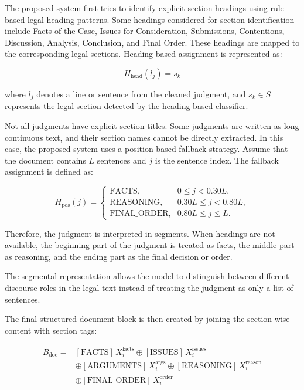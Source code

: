 \documentclass[11pt, a4paper]{article}
\theoremstyle{plain}%
\theoremstyle{remark}%
\theoremstyle{definition}%
\begin{document}
The proposed system first tries to identify explicit section headings using rule-based legal heading patterns. Some headings considered for section identification include Facts of the Case, Issues for Consideration, Submissions, Contentions, Discussion, Analysis, Conclusion, and Final Order. These headings are mapped to the corresponding legal sections. Heading-based assignment is represented as:

\begin{equation}
H_{\text{head}}(l_j) = s_k
\end{equation}

where \(l_j\) denotes a line or sentence from the cleaned judgment, and 
\(s_k \in S\) represents the legal section detected by the heading-based 
classifier.

Not all judgments have explicit section titles. Some judgments are written as long continuous text, and their section names cannot be directly extracted. In this case, the proposed system uses a position-based fallback strategy. Assume that the document contains \(L\) sentences and \(j\) is the sentence index. The fallback assignment is defined as:

\begin{equation}
H_{\text{pos}}(j)=
\begin{cases}
\text{FACTS}, & 0 \leq j < 0.30L, \\
\text{REASONING}, & 0.30L \leq j < 0.80L, \\
\text{FINAL\_ORDER}, & 0.80L \leq j \leq L.
\end{cases}
\end{equation}

Therefore, the judgment is interpreted in segments. When headings are not available, the beginning part of the judgment is treated as facts, the middle part as reasoning, and the ending part as the final decision or order.

The segmental representation allows the model to distinguish between different discourse roles in the legal text instead of treating the judgment as only a list of sentences.

The final structured document block is then created by joining the section-wise content with section tags:

\begin{equation}
\begin{aligned}
B_{\text{doc}} ={}& [\text{FACTS}]\,X_i^{\text{facts}}
\oplus [\text{ISSUES}]\,X_i^{\text{issues}} \\
&\oplus [\text{ARGUMENTS}]\,X_i^{\text{args}}
\oplus [\text{REASONING}]\,X_i^{\text{reason}} \\
&\oplus [\text{FINAL\_ORDER}]\,X_i^{\text{order}}
\end{aligned}
\end{equation}
\end{document}
